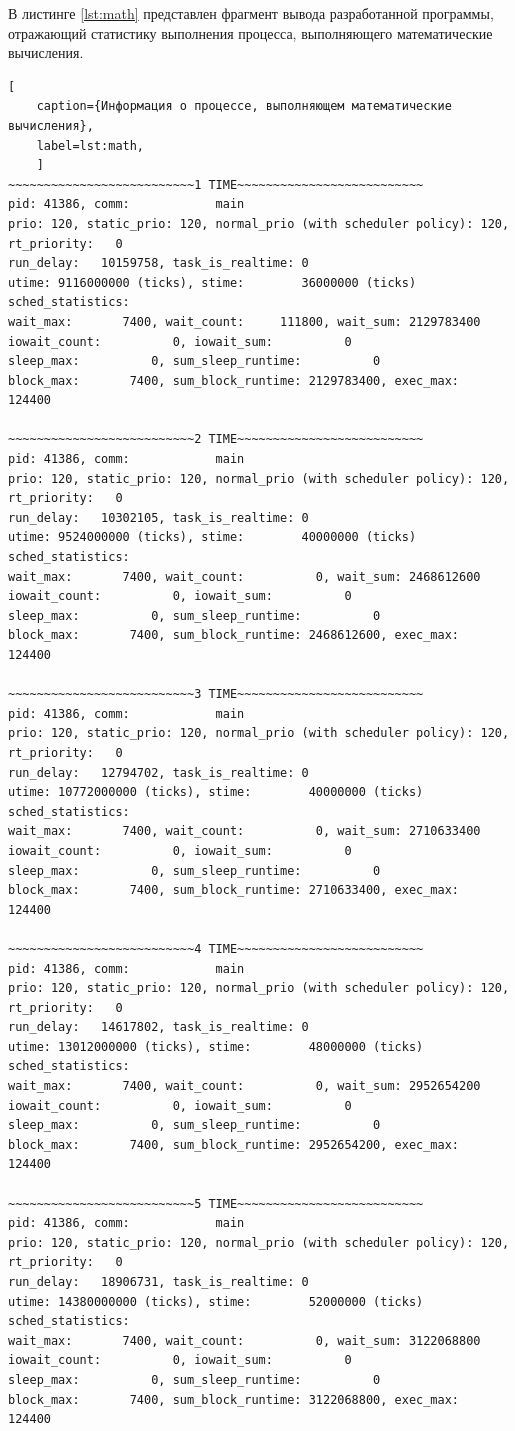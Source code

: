 В листинге \ref{lst:math} представлен фрагмент вывода разработанной программы, отражающий статистику выполнения процесса, выполняющего математические вычисления.

\begin{lstlisting}[
	caption={Информация о процессе, выполняющем математические вычисления},
	label=lst:math,
	]
~~~~~~~~~~~~~~~~~~~~~~~~~~1 TIME~~~~~~~~~~~~~~~~~~~~~~~~~~
pid: 41386, comm:            main
prio: 120, static_prio: 120, normal_prio (with scheduler policy): 120, 
rt_priority:   0
run_delay:   10159758, task_is_realtime: 0
utime: 9116000000 (ticks), stime:        36000000 (ticks)
sched_statistics:
wait_max:       7400, wait_count:     111800, wait_sum: 2129783400
iowait_count:          0, iowait_sum:          0
sleep_max:          0, sum_sleep_runtime:          0
block_max:       7400, sum_block_runtime: 2129783400, exec_max:     124400

~~~~~~~~~~~~~~~~~~~~~~~~~~2 TIME~~~~~~~~~~~~~~~~~~~~~~~~~~
pid: 41386, comm:            main
prio: 120, static_prio: 120, normal_prio (with scheduler policy): 120, 
rt_priority:   0
run_delay:   10302105, task_is_realtime: 0
utime: 9524000000 (ticks), stime:        40000000 (ticks)
sched_statistics:
wait_max:       7400, wait_count:          0, wait_sum: 2468612600
iowait_count:          0, iowait_sum:          0
sleep_max:          0, sum_sleep_runtime:          0
block_max:       7400, sum_block_runtime: 2468612600, exec_max:     124400

~~~~~~~~~~~~~~~~~~~~~~~~~~3 TIME~~~~~~~~~~~~~~~~~~~~~~~~~~
pid: 41386, comm:            main
prio: 120, static_prio: 120, normal_prio (with scheduler policy): 120, 
rt_priority:   0
run_delay:   12794702, task_is_realtime: 0
utime: 10772000000 (ticks), stime:        40000000 (ticks)
sched_statistics:
wait_max:       7400, wait_count:          0, wait_sum: 2710633400
iowait_count:          0, iowait_sum:          0
sleep_max:          0, sum_sleep_runtime:          0
block_max:       7400, sum_block_runtime: 2710633400, exec_max:     124400

~~~~~~~~~~~~~~~~~~~~~~~~~~4 TIME~~~~~~~~~~~~~~~~~~~~~~~~~~
pid: 41386, comm:            main
prio: 120, static_prio: 120, normal_prio (with scheduler policy): 120, 
rt_priority:   0
run_delay:   14617802, task_is_realtime: 0
utime: 13012000000 (ticks), stime:        48000000 (ticks)
sched_statistics:
wait_max:       7400, wait_count:          0, wait_sum: 2952654200
iowait_count:          0, iowait_sum:          0
sleep_max:          0, sum_sleep_runtime:          0
block_max:       7400, sum_block_runtime: 2952654200, exec_max:     124400

~~~~~~~~~~~~~~~~~~~~~~~~~~5 TIME~~~~~~~~~~~~~~~~~~~~~~~~~~
pid: 41386, comm:            main
prio: 120, static_prio: 120, normal_prio (with scheduler policy): 120, 
rt_priority:   0
run_delay:   18906731, task_is_realtime: 0
utime: 14380000000 (ticks), stime:        52000000 (ticks)
sched_statistics:
wait_max:       7400, wait_count:          0, wait_sum: 3122068800
iowait_count:          0, iowait_sum:          0
sleep_max:          0, sum_sleep_runtime:          0
block_max:       7400, sum_block_runtime: 3122068800, exec_max:     124400

\end{lstlisting}

